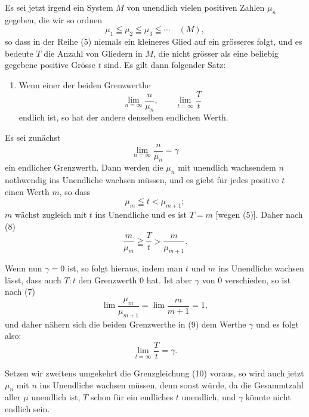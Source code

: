 \documentclass[11pt]{article}
\begin{document}
Es sei jetzt irgend ein System $M$ von unendlich vielen positiven Zahlen $\mu_n$ gegeben, die wir so ordnen
\begin{equation}
\mu_1\leqq\mu_2\leqq\mu_3\leqq\cdots\quad (M),
\tag{5}
\end{equation}
so dass in der Reihe (5) niemals ein kleineres Glied auf ein grösseres folgt, und es bedeute $T$ die Anzahl von Gliedern in $M$, die nicht grösser als eine beliebig gegebene positive Grösse $t$ sind. Es gilt dann folgender Satz:

\begin{enumerate}[label=\textbf{\arabic*.},leftmargin=2.2em,start=4]
\item Wenn einer der beiden Grenzwerthe
\begin{equation}
\lim_{n=\infty}\frac{n}{\mu_n},\qquad \lim_{t=\infty}\frac{T}{t}
\tag{6}
\end{equation}
endlich ist, so hat der andere denselben endlichen Werth.
\end{enumerate}

Es sei zunächst
\begin{equation}
\lim_{n=\infty}\frac{n}{\mu_n}=\gamma
\tag{7}
\end{equation}
ein endlicher Grenzwerth. Dann werden die $\mu_n$ mit unendlich wachsendem $n$ nothwendig ins Unendliche wachsen müssen, und es giebt für jedes positive $t$ einen Werth $m$, so dass
\begin{equation}
\mu_m\leqq t<\mu_{m+1};
\tag{8}
\end{equation}
$m$ wächst zugleich mit $t$ ins Unendliche und es ist $T=m$ [wegen (5)]. Daher nach (8)
\begin{equation}
\frac{m}{\mu_m}\geqq\frac{T}{t}>\frac{m}{\mu_{m+1}} .
\tag{9}
\end{equation}

Wenn nun $\gamma=0$ ist, so folgt hieraus, indem man $t$ und $m$ ins Unendliche wachsen lässt, dass auch $T:t$ den Grenzwerth $0$ hat. Ist aber $\gamma$ von $0$ verschieden, so ist nach (7)
\[
\lim\frac{\mu_m}{\mu_{m+1}}=\lim\frac{m}{m+1}=1,
\]
und daher nähern sich die beiden Grenzwerthe in (9) dem Werthe $\gamma$ und es folgt also:
\begin{equation}
\lim_{t=\infty}\frac{T}{t}=\gamma.
\tag{10}
\end{equation}

Setzen wir zweitens umgekehrt die Grenzgleichung (10) voraus, so wird auch jetzt $\mu_n$ mit $n$ ins Unendliche wachsen müssen, denn sonst würde, da die Gesammtzahl aller $\mu$ unendlich ist, $T$ schon für ein endliches $t$ unendlich, und $\gamma$ könnte nicht endlich sein.
\end{document}
